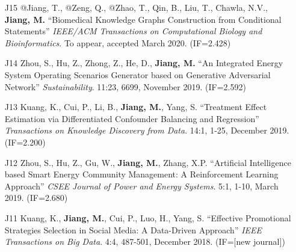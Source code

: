 \documentclass[10pt]{article}
\newenvironment{myindentpar}[1]%
{\begin{list}{}%
         {\setlength{\leftmargin}{#1}}%
         \item[]%
}
{\end{list}}
\newcounter{list}
\newcommand{\hide}[1]{}
\begin{document}
\begin{myindentpar}{0.00cm}
\begin{enumerate}[leftmargin=.5cm]
\item[J15] @Jiang, T., @Zeng, Q., @Zhao, T., Qin, B., Liu, T., Chawla, N.V., \textbf{Jiang, M.} ``Biomedical Knowledge Graphs Construction from Conditional Statements'' \textit{IEEE/ACM Transactions on Computational Biology and Bioinformatics}. To appear, accepted March 2020. (IF=2.428)

\item[J14] Zhou, S., Hu, Z., Zhong, Z., He, D., \textbf{Jiang, M.} ``An Integrated Energy System Operating Scenarios Generator based on Generative Adversarial Network'' \textit{Sustainability}. 11:23, 6699, November 2019. (IF=2.592)
		
\item[J13] Kuang, K., Cui, P., Li, B., \textbf{Jiang, M.}, Yang, S. ``Treatment Effect Estimation via Differentiated Confounder Balancing and Regression'' \textit{Transactions on Knowledge Discovery from Data}. 14:1, 1-25, December 2019. (IF=2.200)

	\hide{\vspace{-0.1cm}\hspace{0.5cm}{\small \emph{Mr. Kuang conceived the idea in consultation with myself. Mr. Kuang implemented the system and completed the experiments. Mr. Kuang wrote the paper.}}}

\item[J12] Zhou, S., Hu, Z., Gu, W., \textbf{Jiang, M.}, Zhang, X.P. ``Artificial Intelligence based Smart Energy Community Management: A Reinforcement Learning Approach'' \textit{CSEE Journal of Power and Energy Systems}. 5:1, 1-10, March 2019. (IF=2.680)

	\hide{\vspace{-0.1cm}\hspace{0.5cm}{\small \emph{I made 3\% contribution. Dr. Zhou conceived the idea, implemented the system, and completed the experiments. I joined the discussion and edited the paper.}}}

\item[J11] Kuang, K., \textbf{Jiang, M.}, Cui, P., Luo, H., Yang, S. ``Effective Promotional Strategies Selection in Social Media: A Data-Driven Approach'' \textit{IEEE Transactions on Big Data}. 4:4, 487-501, December 2018. (IF=[new journal])

	\hide{\vspace{-0.1cm}\hspace{0.5cm}{\small \emph{I made 40\% contribution. I conceived the idea and design the study. Mr. Kuang completed the experiments. Mr. Kuang and I wrote the paper.}}}


\end{enumerate}
\end{myindentpar}
\end{document}
